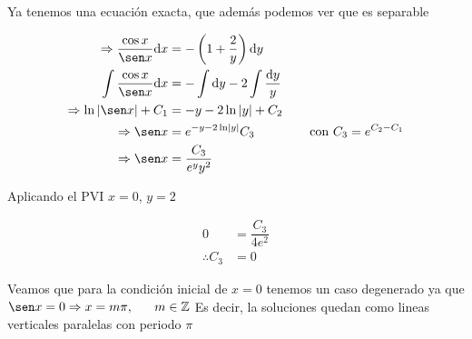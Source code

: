 Ya tenemos una ecuación exacta, que además podemos ver que es separable
 
 \begin{align*}
     \Rightarrow \dfrac{\cos x}{\sen x}\dd x&=-\pr{1+\dfrac{2}{y}} \dd y\\
     \int \dfrac{\cos x}{\sen x} \dd x &= -\int \dd y -2\int\dfrac{\dd y}{y} \\ \Rightarrow \ln \nr{\sen x} + C_1 &= -y -2\ln\nr{y} +C_2 \\ 
     \Rightarrow \sen x &= e^{-y-2\ln\nr{y}}C_3 ~~~~~~~~~~~~~ \text{con $C_3=e^{C_2-C_1}$} \\
     \Rightarrow \sen x&= \dfrac{C_3}{e^y y^2}
 \end{align*}
 
 \begin{center}
 \end{center}
 
 Aplicando el PVI $x=0$, $y=2$ 
 
 \begin{align*}
     0&=\dfrac{C_3}{4e^2} \\
     \therefore C_3 &= 0
 \end{align*}
 
Veamos que para la condición inicial de $x=0$  tenemos un caso degenerado ya que $\sen x=0 \Rightarrow x=m\pi,~~~~~m\in \mathbb{Z}$  Es decir, la soluciones quedan como lineas verticales paralelas con periodo $\pi$ 

